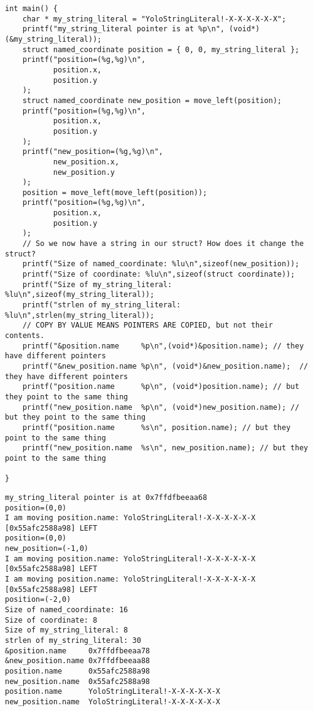 \documentclass[11pt]{article}
\begin{document}
\begin{enumerate}
\begin{verbatim}
int main() {
    char * my_string_literal = "YoloStringLiteral!-X-X-X-X-X-X";
    printf("my_string_literal pointer is at %p\n", (void*)(&my_string_literal));
    struct named_coordinate position = { 0, 0, my_string_literal };
    printf("position=(%g,%g)\n",
           position.x,
           position.y
    );
    struct named_coordinate new_position = move_left(position);
    printf("position=(%g,%g)\n",
           position.x,
           position.y
    );
    printf("new_position=(%g,%g)\n",
           new_position.x,
           new_position.y
    );
    position = move_left(move_left(position));
    printf("position=(%g,%g)\n",
           position.x,
           position.y
    );
    // So we now have a string in our struct? How does it change the struct?
    printf("Size of named_coordinate: %lu\n",sizeof(new_position));
    printf("Size of coordinate: %lu\n",sizeof(struct coordinate));
    printf("Size of my_string_literal: %lu\n",sizeof(my_string_literal));
    printf("strlen of my_string_literal: %lu\n",strlen(my_string_literal));
    // COPY BY VALUE MEANS POINTERS ARE COPIED, but not their contents.
    printf("&position.name     %p\n",(void*)&position.name); // they have different pointers
    printf("&new_position.name %p\n", (void*)&new_position.name);  // they have different pointers
    printf("position.name      %p\n", (void*)position.name); // but they point to the same thing
    printf("new_position.name  %p\n", (void*)new_position.name); // but they point to the same thing
    printf("position.name      %s\n", position.name); // but they point to the same thing
    printf("new_position.name  %s\n", new_position.name); // but they point to the same thing

}
\end{verbatim}

\begin{verbatim}
my_string_literal pointer is at 0x7ffdfbeeaa68
position=(0,0)
I am moving position.name: YoloStringLiteral!-X-X-X-X-X-X [0x55afc2588a98] LEFT
position=(0,0)
new_position=(-1,0)
I am moving position.name: YoloStringLiteral!-X-X-X-X-X-X [0x55afc2588a98] LEFT
I am moving position.name: YoloStringLiteral!-X-X-X-X-X-X [0x55afc2588a98] LEFT
position=(-2,0)
Size of named_coordinate: 16
Size of coordinate: 8
Size of my_string_literal: 8
strlen of my_string_literal: 30
&position.name     0x7ffdfbeeaa78
&new_position.name 0x7ffdfbeeaa88
position.name      0x55afc2588a98
new_position.name  0x55afc2588a98
position.name      YoloStringLiteral!-X-X-X-X-X-X
new_position.name  YoloStringLiteral!-X-X-X-X-X-X
\end{verbatim}
\end{enumerate}
\end{document}
